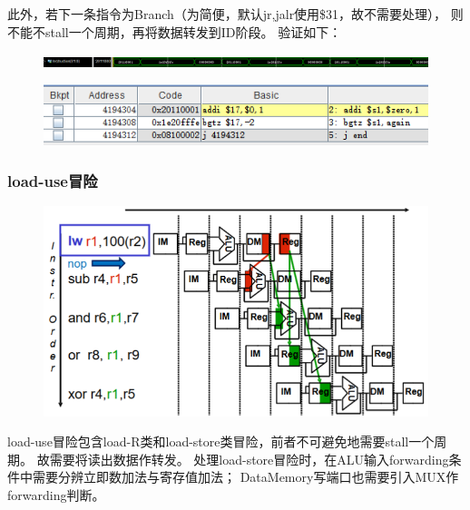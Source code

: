 \documentclass[10pt]{article}
\begin{document}
此外，若下一条指令为Branch（为简便，默认jr,jalr使用\$31，故不需要处理），
则不能不stall一个周期，再将数据转发到ID阶段。
验证如下：
\begin{figure}[H]
    \centering
    \includegraphics[scale=0.4]{bgtzz.png}
    \end{figure}
    \begin{figure}[H]
        \centering
        \includegraphics[scale=0.9]{bgtz.png}
        \end{figure}
\subsubsection{load-use冒险}
\begin{figure}[H]
    \centering
    \includegraphics[scale=0.6]{load.png}
    \end{figure}
load-use冒险包含load-R类和load-store类冒险，前者不可避免地需要stall一个周期。
故需要将读出数据作转发。
处理load-store冒险时，在ALU输入forwarding条件中需要分辨立即数加法与寄存值加法；
DataMemory写端口也需要引入MUX作forwarding判断。
\end{document}
